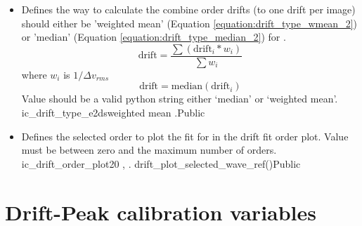 \begin{itemize}
\item {}
{Defines the way to calculate the combine order drifts (to one drift per image) should either be 'weighted mean' (Equation \ref{equation:drift_type_wmean_2}) or 'median' (Equation \ref{equation:drift_type_median_2}) for \calDRIFTE.
\begin{equation}
\label{equation:drift_type_wmean_2}
\text{drift} = \frac{\sum{(\text{drift}_i * w_i)}}{\sum{w_i}}
\end{equation}
\noindent where $w_i$ is $1/\Delta v_{rms}$
\begin{equation}
\label{equation:drift_type_median_2}
\text{drift} = \text{median}(\text{drift}_i)
\end{equation}
\noindent Value should be a valid python string either `median' or `weighted mean'.
}
{ic\_drift\_type\_e2ds}{weighted mean}
{\calDRIFTE}{\constantsfile}{\calDRIFTE.\progMAIN}{Public}

\item {}
{Defines the selected order to plot the fit for in the drift fit order plot. Value must be between zero and the maximum number of orders.}
{ic\_drift\_order\_plot}{20}
{\calDRIFTRAW, \calDRIFTE}{\constantsfile}{\spirouPlot. drift\_plot\_selected\_wave\_ref()}{Public}

\end{itemize}

\clearpage
\newpage
\section{Drift-Peak calibration variables}
\label{ch:variables:driftpeak}

